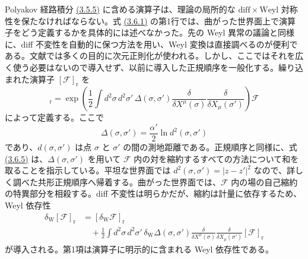 Polyakov 経路積分 \hyperref[eq:3.5.5]{(3.5.5)} に含める演算子は、理論の局所的な $\mathrm{diff}\times\mathrm{Weyl}$ 対称性を保たなければならない。式 \hyperref[eq:3.6.1]{(3.6.1)} の第1行では、曲がった世界面上で演算子をどう定義するかを具体的には述べなかった。先の Weyl 異常の議論と同様に、diff 不変性を自動的に保つ方法を用い、Weyl 変換は直接調べるのが便利である。文献では多くの目的に次元正則化が使われる。しかし、ここではそれを広く使う必要はないので導入せず、以前に導入した正規順序を一般化する。繰り込まれた演算子 $[\mathcal F]_{\mathrm r}$ を
\begin{equation}
[\mathcal F]_{\mathrm r}=
\exp\left(\frac12\int d^2\sigma\,d^2\sigma'\,
\Delta(\sigma,\sigma')
\frac{\delta}{\delta X^\mu(\sigma)}
\frac{\delta}{\delta X_\mu(\sigma')}\right)\mathcal F
\tag{3.6.5}\label{eq:3.6.5}
\end{equation}
によって定義する。ここで
\begin{equation}
\Delta(\sigma,\sigma')=\frac{\alpha'}2\ln d^2(\sigma,\sigma')
\tag{3.6.6}\label{eq:3.6.6}
\end{equation}
であり、$d(\sigma,\sigma')$ は点 $\sigma$ と $\sigma'$ の間の測地距離である。正規順序と同様に、式 \hyperref[eq:3.6.5]{(3.6.5)} は、$\Delta(\sigma,\sigma')$ を用いて $\mathcal F$ 内の対を縮約するすべての方法について和を取ることを指示している。平坦な世界面では $d^2(\sigma,\sigma')=|z-z'|^2$ なので、詳しく調べた共形正規順序へ帰着する。曲がった世界面では、$\mathcal F$ 内の場の自己縮約の特異部分を相殺する。diff 不変性は明らかだが、縮約は計量に依存するため、Weyl 依存性
\begin{equation}
\begin{aligned}
\delta_{\mathrm W}[\mathcal F]_{\mathrm r}
&=[\delta_{\mathrm W}\mathcal F]_{\mathrm r}\\
&\quad+\frac12\int d^2\sigma\,d^2\sigma'\,
\delta_{\mathrm W}\Delta(\sigma,\sigma')
\frac{\delta}{\delta X^\mu(\sigma)}
\frac{\delta}{\delta X_\mu(\sigma')}[\mathcal F]_{\mathrm r}
\end{aligned}
\tag{3.6.7}\label{eq:3.6.7}
\end{equation}
が導入される。第1項は演算子に明示的に含まれる Weyl 依存性である。

